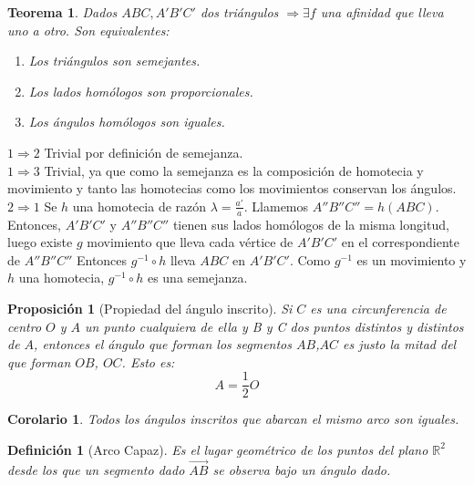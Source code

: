 \documentclass[11pt, a4paper]{article}
\makeatletter
\newif\IfInSansMode
\let\oldsf\sffamily
\renewcommand*{\sffamily}{\oldsf\mathversion{sans}\InSansModetrue}
\let\oldnorm\normalfont
\renewcommand*{\normalfont}{\oldnorm\InSansModefalse\mathversion{normal}}
\renewenvironment{proof}[1][\proofname] {\vspace{-15pt}\par\pushQED{\qed}\normalfont\topsep6\p@\@plus6\p@\relax\trivlist\item[\hskip\labelsep\it#1\@addpunct{.}]\ignorespaces}{\popQED\endtrivlist\@endpefalse}
\newcommand{\R}{\mathbb{R}}
\renewcommand{\vec}{\overrightarrow}
\renewenvironment{proof}[1][\proofname] {\par\pushQED{\qed}\normalfont\topsep6\p@\@plus6\p@\relax\trivlist\item[\hskip\labelsep\itshape\sffamily#1\@addpunct{.}]\ignorespaces}{\popQED\endtrivlist\@endpefalse}
\theoremstyle{theorem-style}
\newtheorem{nth}{Teorema}[section]
\newtheorem{nprop}{Proposición}[section]
\newtheorem{ncor}{Corolario}[section]
\theoremstyle{definition-style}
\newtheorem{ndef}{Definición}[section]
\theoremstyle{remark-style}
\theoremstyle{example-style}
\makeatother
\begin{document}
\begin{nth}
  Dados $ABC, A'B'C'$ dos triángulos $\Rightarrow \exists f$ una afinidad que lleva uno a otro. Son equivalentes:
  \begin{enumerate}
  \item Los triángulos son semejantes.
  \item Los lados homólogos son proporcionales.
  \item Los ángulos homólogos son iguales.
  \end{enumerate}	
\end{nth}

\begin{proof} \hfill 

  $\boxed{1 \Rightarrow 2}$ Trivial por definición de semejanza.\\
  $\boxed{1 \Rightarrow 3}$ Trivial, ya que como la semejanza es la composición de homotecia y movimiento y tanto las homotecias como los movimientos conservan los ángulos.\\
  $\boxed{2 \Rightarrow 1}$ Se $h$ una homotecia de razón $\lambda = \frac{a'}{a}$. Llamemos $A''B''C'' = h(ABC)$. Entonces, $A'B'C'$ y $A''B''C''$ tienen sus lados homólogos de la misma longitud, luego existe $g$ movimiento que lleva cada vértice de $A'B'C'$ en el correspondiente de $A''B''C''$ Entonces $g^{-1} \circ h$ lleva $ABC$ en $	A'B'C'$. Como $g^{-1}$ es un movimiento y $h$ una homotecia, $g^{-1} \circ h$ es una semejanza.
\end{proof}


\begin{nprop}[Propiedad del ángulo inscrito]
  Si $C$ es una circunferencia de centro $O$ y $A$ un punto cualquiera de ella y B y C dos puntos distintos y distintos de $A$, entonces el ángulo que forman los segmentos $AB$,$AC$ es justo la mitad del que forman $OB$, $OC$. Esto es:
  \[
    A = \dfrac{1}{2} O
  \]
\end{nprop}
\begin{ncor}
  Todos los ángulos inscritos que abarcan el mismo arco son iguales.
\end{ncor}

\begin{ndef}[Arco Capaz]
	Es el lugar geométrico de los puntos del plano $\R^2$ desde los que un segmento dado $\vec{AB}$ se observa bajo un ángulo dado.
\end{ndef}
\end{document}
